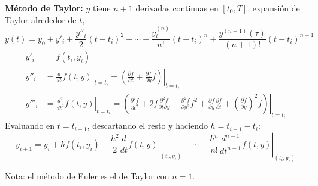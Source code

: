 \documentclass[9pt, aspectratio=169]{beamer}
\begin{document}
\begin{frame}
    \textbf{Método de Taylor:} $y$ tiene $n+1$ derivadas continuas en $[t_0, T]$, expansión de Taylor alrededor de $t_i$:
    \[ y(t) = y_0 + y'_i + \frac{y''_i}{2}(t-t_i)^2 + \cdots + \frac{y^{(n)}_i}{n!} (t-t_i)^n + \frac{y^{(n+1)}(\tau)}{(n+1)!} (t-t_i)^{n+1} \]
\begin{align*}
    y'_i &= f(t_i, y_i) \\
    y''_i &= \left. \frac{d}{dt} f(t, y) \right|_{t = t_i} = \left. \left(\frac{\partial f}{\partial t} + \frac{\partial f}{\partial y} f \right) \right|_{t = t_i} \\
    y'''_i &= \left. \frac{d^2}{dt^2} f(t, y) \right|_{t = t_i} = \left. \left( \frac{\partial^2f}{\partial t^2} + 2 f \frac{\partial^2 f}{\partial t \partial y} + \frac{\partial^2 f}{\partial y^2} f^2 + \frac{\partial f}{\partial y} \frac{\partial f}{\partial t} + \left(\frac{\partial f}{\partial y} \right)^2 f \right) \right|_{t=t_i}
\end{align*}
Evaluando en $t=t_{i+1}$, descartando el resto y haciendo $h = t_{i+1} - t_i$:
\[ y_{i+1} = y_i + h f(t_i, y_i) + \frac{h^2}{2} \left. \frac{d}{dt} f(t, y) \right|_{(t_i, y_i)} + \cdots + \frac{h^n}{n!} \left. \frac{d^{n-1}}{dt^{n-1}} f(t, y) \right|_{(t_i, y_i)} \] 
        
        {\centering \alert{Nota:} el método de Euler es el de Taylor con $n = 1$. }
\end{frame}
\end{document}
